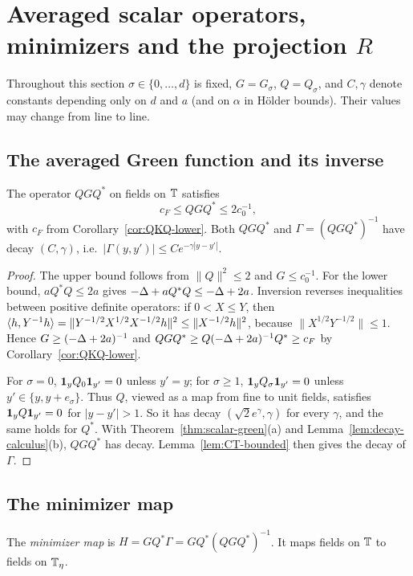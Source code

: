 \section{Averaged scalar operators, minimizers and the projection \texorpdfstring{$R$}{R}}\label{sec:scalar-avg}

Throughout this section $\sigma\in\{0,\dots,d\}$ is fixed, $G=G_\sigma$, $Q=Q_\sigma$, and $C,\gamma$ denote constants depending only on $d$ and $a$ (and on $\alpha$ in H\"older bounds). Their values may change from line to line.

\subsection{The averaged Green function and its inverse}

\begin{proposition}\label{prop:QGQ}
The operator $QGQ^*$ on fields on $\mathbb T$ satisfies
\[
c_F\le QGQ^*\le 2c_0^{-1},
\]
with $c_F$ from Corollary~\ref{cor:QKQ-lower}. Both $QGQ^*$ and $\Gamma=(QGQ^*)^{-1}$ have decay $(C,\gamma)$, i.e.\ $|\Gamma(y,y')|\le Ce^{-\gamma|y-y'|}$.
\end{proposition}

\begin{proof}
The upper bound follows from $\|Q\|^2\le2$ and $G\le c_0^{-1}$. For the lower bound, $aQ^*Q\le2a$ gives $-\Delta+aQ^*Q\le-\Delta+2a$. Inversion reverses inequalities between positive definite operators: if $0<X\le Y$, then $\langle h,Y^{-1}h\rangle=\|Y^{-1/2}X^{1/2}X^{-1/2}h\|^2\le\|X^{-1/2}h\|^2$, because $\|X^{1/2}Y^{-1/2}\|\le1$. Hence $G\ge(-\Delta+2a)^{-1}$ and $QGQ^*\ge Q(-\Delta+2a)^{-1}Q^*\ge c_F$ by Corollary~\ref{cor:QKQ-lower}.

For $\sigma=0$, $\mathbf 1_yQ_0\mathbf 1_{y'}=0$ unless $y'=y$; for $\sigma\ge1$, $\mathbf 1_yQ_\sigma\mathbf 1_{y'}=0$ unless $y'\in\{y,y+e_\sigma\}$. Thus $Q$, viewed as a map from fine to unit fields, satisfies $\mathbf 1_yQ\mathbf 1_{y'}=0$ for $|y-y'|>1$. So it has decay $(\sqrt2e^{\gamma},\gamma)$ for every $\gamma$, and the same holds for $Q^*$. With Theorem~\ref{thm:scalar-green}(a) and Lemma~\ref{lem:decay-calculus}(b), $QGQ^*$ has decay. Lemma~\ref{lem:CT-bounded} then gives the decay of $\Gamma$.
\end{proof}

\subsection{The minimizer map}

\begin{definition}
The \emph{minimizer map} is $H=GQ^*\Gamma=GQ^*(QGQ^*)^{-1}$. It maps fields on $\mathbb T$ to fields on $\mathbb T_\eta$.
\end{definition}

